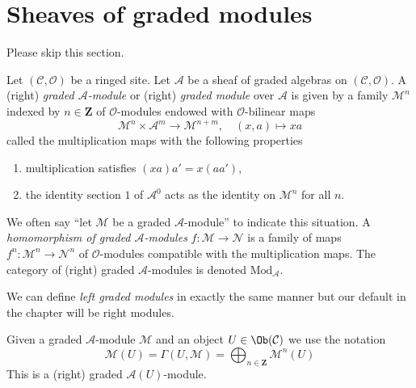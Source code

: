 \section{Sheaves of graded modules}
\label{section-graded-modules}

\noindent
Please skip this section.

\begin{definition}
\label{definition-gm}
Let $(\mathcal{C}, \mathcal{O})$ be a ringed site.
Let $\mathcal{A}$ be a sheaf of graded algebras
on $(\mathcal{C}, \mathcal{O})$.
A (right) {\it graded $\mathcal{A}$-module} or (right)
{\it graded module} over $\mathcal{A}$
is given by a family $\mathcal{M}^n$ indexed by $n \in \mathbf{Z}$
of $\mathcal{O}$-modules endowed with
$\mathcal{O}$-bilinear maps
$$
\mathcal{M}^n \times \mathcal{A}^m \to \mathcal{M}^{n + m},\quad
(x, a) \longmapsto xa
$$
called the multiplication maps with the following properties
\begin{enumerate}
\item multiplication satisfies $(xa)a' = x(aa')$,
\item the identity section $1$ of $\mathcal{A}^0$
acts as the identity on $\mathcal{M}^n$ for all $n$.
\end{enumerate}
We often say ``let $\mathcal{M}$ be a graded $\mathcal{A}$-module''
to indicate this situation.
A {\it homomorphism of graded $\mathcal{A}$-modules}
$f : \mathcal{M} \to \mathcal{N}$ is a family of maps
$f^n : \mathcal{M}^n \to \mathcal{N}^n$
of $\mathcal{O}$-modules compatible with the multiplication maps.
The category of (right) graded $\mathcal{A}$-modules
is denoted $\text{Mod}_\mathcal{A}$.
\end{definition}

\noindent
We can define {\it left graded modules} in exactly the same manner
but our default in the chapter will be right modules.

\medskip\noindent
Given a graded $\mathcal{A}$-module $\mathcal{M}$
and an object $U \in \Ob(\mathcal{C})$ we use the notation
$$
\mathcal{M}(U) =
\Gamma(U, \mathcal{M}) =
\bigoplus\nolimits_{n \in \mathbf{Z}} \mathcal{M}^n(U)
$$
This is a (right) graded $\mathcal{A}(U)$-module.

